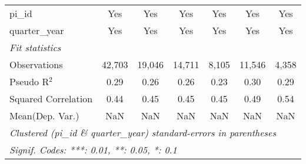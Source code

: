 \begin{tabular}{lcccccc}
   pi\_id                                                     & Yes           & Yes           & Yes          & Yes            & Yes           & Yes\\  
   quarter\_year                                              & Yes           & Yes           & Yes          & Yes            & Yes           & Yes\\  
   \midrule
   \emph{Fit statistics}\\
   Observations                                               & 42,703        & 19,046        & 14,711       & 8,105          & 11,546        & 4,358\\  
   Pseudo R$^2$                                               & 0.29          & 0.26          & 0.26         & 0.23           & 0.30          & 0.29\\  
   Squared Correlation                                        & 0.44          & 0.45          & 0.45         & 0.45           & 0.49          & 0.54\\  
Mean(Dep. Var.) & NaN & NaN & NaN & NaN & NaN & NaN \\
   \midrule \midrule
   \multicolumn{7}{l}{\emph{Clustered (pi\_id \& quarter\_year) standard-errors in parentheses}}\\
   \multicolumn{7}{l}{\emph{Signif. Codes: ***: 0.01, **: 0.05, *: 0.1}}\\
\end{tabular}
\par\endgroup
